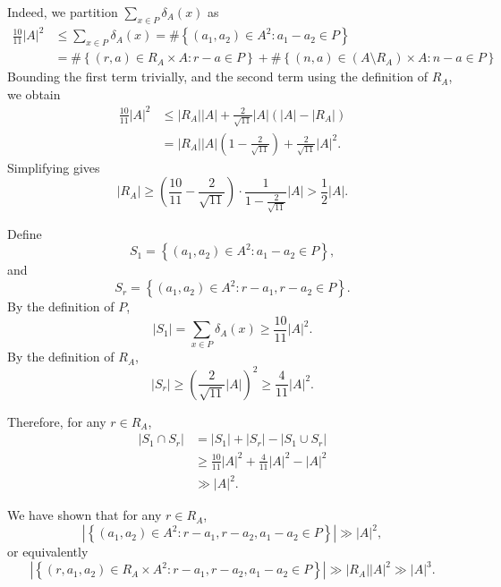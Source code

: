 \documentclass[reqno]{amsart}
\numberwithin{equation}{section}
\begin{document}
Indeed, we partition \( \sum _{x \in P} \delta_{A} (x)\) as
\begin{align*}
    \frac{10}{11} \left\lvert A \right\rvert ^{2} & \leq \sum _{x \in P} \delta_{A} (x) = \# \left\{ (a_1,a_2)\in A^{2}: a_1-a_2 \in P \right\}\\
    & = \# \left\{ (r,a)\in R_{A} \times A  : r - a \in P\right\} + \# \left\{ (n,a)\in \left( A \setminus R_{A}  \right) \times A : n - a \in P \right\} 
\end{align*}
Bounding the first term trivially, and the second term using the definition of \(R_{A} \), we obtain
\begin{align*}
    \frac{10}{11} \left\lvert A \right\rvert ^{2} & \leq \left\lvert R_{A}  \right\rvert \left\lvert A \right\rvert  + \frac{2}{\sqrt{11} } \left\lvert A \right\rvert \left( \left\lvert A \right\rvert - \left\lvert R_{A}  \right\rvert  \right) \\
    &  = \left\lvert R_{A}  \right\rvert \left\lvert A \right\rvert \left( 1 - \frac{2}{\sqrt{11} }  \right) + \frac{2}{\sqrt{11} } \left\lvert A \right\rvert ^{2}.
\end{align*}
Simplifying gives
\[
|R_{A} |\geq \left(\frac{10}{11}-\frac{2}{\sqrt{11}}\right) \cdot \frac{1}{1-\frac{2}{\sqrt{11}}}|A| > \frac{1}{2}|A|
.\]

Define
\[
S_1=\left\{\left(a_1, a_2\right) \in A^2: a_1-a_2 \in P \right\}
,\]
and
\[
S_r=\left\{\left(a_1, a_2\right) \in A^2: r-a_1, r-a_2 \in P \right\}
.\]
By the definition of \(P\),
\[
\left|S_1\right|=\sum_{x \in P} \delta_A(x) \geq \frac{10}{11}|A|^2
.\]
By the definition of \(R_{A} \),
\[
\left|S_r\right| \geq\left(\frac{2}{\sqrt{11}}|A|\right)^2 \geq \frac{4}{11}|A|^2
.\]

Therefore, for any \(r \in R_{A} \),
\[
\begin{aligned}
\left|S_1 \cap S_r\right| & =\left|S_1\right|+\left|S_r\right|-\left|S_1 \cup S_r\right| \\
& \geq \frac{10}{11}|A|^2+\frac{4}{11}|A|^2-|A|^2 \\
& \gg|A|^2 .
\end{aligned}
\]


We have shown that for any \(r \in R_{A} \),
\[
\left|\left\{\left(a_1, a_2\right) \in A^2: r-a_1, r-a_2, a_1-a_2 \in P \right\}\right| \gg|A|^2
,\]
or equivalently
\[
\left|\left\{\left(r, a_1, a_2\right) \in R_{A}  \times A^2: r-a_1, r-a_2, a_1-a_2 \in P \right\}\right| \gg|R_{A} ||A|^2 \gg|A|^3
.\]
\end{document}
